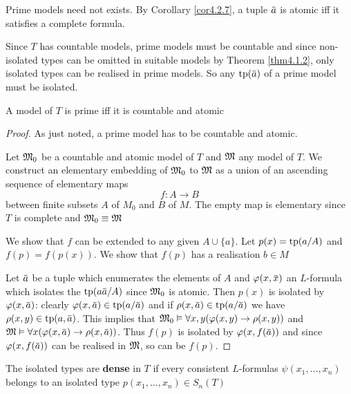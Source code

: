 \documentclass[11pt]{article}
\begin{document}
Prime models need not exists. By Corollary \ref{cor4.2.7}, a tuple \(\bara\) is atomic iff it
satisfies a complete formula.

Since \(T\) has countable models, prime models must be countable and since non-isolated types
can be omitted in suitable models by Theorem \ref{thm4.1.2}, only isolated types can be realised
in prime models. So any \(\tp(\bara)\) of a prime model must be isolated.

\begin{theorem}[]
A model of \(T\) is prime iff it is countable and atomic
\end{theorem}

\begin{proof}
As just noted, a prime model has to be countable and atomic.

Let \(\mathfrak{M}_0\) be a countable and atomic model of \(T\) and \(\mathfrak{M}\) any model of \(T\). We construct
an elementary embedding of \(\mathfrak{M}_0\) to \(\mathfrak{M}\) as a union of an ascending sequence of elementary
maps
\begin{equation*}
f:A\to B
\end{equation*}
between finite subsets \(A\) of \(M_0\) and \(B\) of \(M\). The empty map is elementary
since \(T\) is complete and \(\mathfrak{M}_0\equiv\mathfrak{M}\)

We show that \(f\) can be extended to any given \(A\cup\{a\}\). Let \(p(x)=\operatorname{tp}(a/A)\)
and \(f(p)=f(p(x))\). We show that \(f(p)\) has a realisation \(b\in M\)

Let \(\bara\) be a tuple which enumerates the elements of \(A\) and \(\varphi(x,\barx)\)
an \(L\)-formula which isolates the \(\tp(a\bara/A)\) since \(\mathfrak{M}_0\) is atomic. Then \(p(x)\) is
isolated by \(\varphi(x,\bara)\): clearly \(\varphi(x,\bara)\in\tp(a/\bara)\) and
if \(\rho(x,\bara)\in\tp(a/\bara)\) we have  \(\rho(x,y)\in\tp(a,\bara)\). This implies
that \(\mathfrak{M}_0\vDash\forall x,y(\varphi(x,y)\to\rho(x,y))\) and \(\fM\vDash\forall x(\varphi(x,\bara)\to\rho(x,\bara))\). Thus \(f(p)\) is
isolated by \(\varphi(x,f(\bara))\) and since \(\varphi(x,f(\bara))\) can be realised in \(\mathfrak{M}\), so can be \(f(p)\).
\end{proof}

\begin{definition}[]
The isolated types are \textbf{dense} in \(T\) if every consistent \(L\)-formulas \(\psi(x_1,\dots,x_n)\) belongs
to an isolated type \(p(x_1,\dots,x_n)\in S_n(T)\)
\end{definition}
\end{document}
